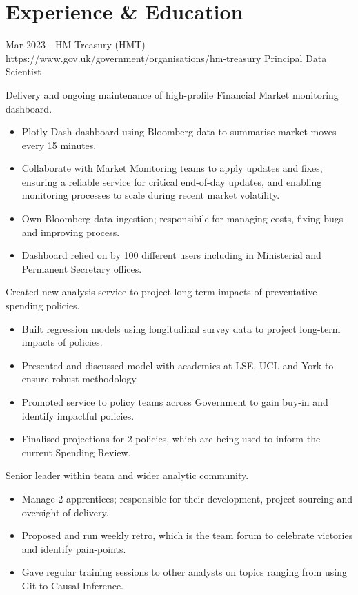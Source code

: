 \documentclass[10pt]{article} %
\begin{document}
\section{Experience \& Education}
\job
{Mar 2023 -}{}
{HM Treasury (HMT)}
{https://www.gov.uk/government/organisations/hm-treasury}
{Principal Data Scientist}
{
  \begin{itemize-noindent}
  \item{Delivery and ongoing maintenance of high-profile Financial Market monitoring dashboard.}
    \begin{itemize}
    \item{Plotly Dash dashboard using Bloomberg data to summarise market moves every 15 minutes.}
    \item{
      Collaborate with Market Monitoring teams to apply updates and fixes, ensuring a reliable  service for critical end-of-day updates,
      and enabling monitoring processes to scale during recent market volatility.
    }
    \item{Own Bloomberg data ingestion; responsibile for managing costs, fixing bugs and improving process.}
    \item{Dashboard relied on by 100 different users including in Ministerial and Permanent Secretary offices.}
    \end{itemize}
    \item{Created new analysis service to project long-term impacts of preventative spending policies.}
    \begin{itemize}
    \item{Built regression models using longitudinal survey data to project long-term impacts of policies.}
    \item{Presented and discussed model with academics at LSE, UCL and York to ensure robust methodology.}
    \item{Promoted service to policy teams across Government to gain buy-in and identify impactful policies.}
    \item{Finalised projections for 2 policies, which are being used to inform the current Spending Review.}
    \end{itemize}
  \item{Senior leader within team and wider analytic community.}
    \begin{itemize}
    \item{Manage 2 apprentices; responsible for their development, project sourcing and oversight of delivery.}
    \item{Proposed and run weekly retro, which is the team forum to celebrate victories and identify pain-points.}
    \item{Gave regular training sessions to other analysts on topics ranging from using Git to Causal Inference.}
    \end{itemize}
  \end{itemize-noindent}
}
\end{document}
